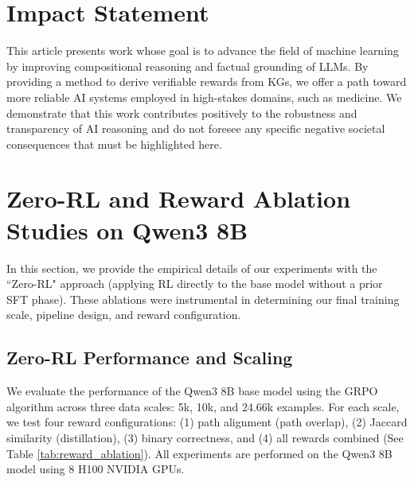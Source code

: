 \documentclass{article}
\theoremstyle{plain}
\theoremstyle{definition}
\theoremstyle{remark}
\begin{document}
\section*{Impact Statement}

This article presents work whose goal is to advance the field of machine
learning by improving compositional reasoning and factual grounding of LLMs. By providing a method to derive verifiable rewards from KGs, we offer a path toward more reliable AI systems employed in high-stakes domains, such as medicine. We demonstrate that this work contributes positively to the robustness and transparency of AI reasoning and do not foresee any specific negative societal consequences that must be highlighted here.





\newpage
\appendix
\onecolumn

\section{Zero-RL and Reward Ablation Studies on Qwen3 8B}
\label{Appendix A}

In this section, we provide the empirical details of our experiments with the ``Zero-RL" approach (applying RL directly to the base model without a prior SFT phase). These ablations were instrumental in determining our final training scale, pipeline design, and reward configuration. 

\subsection{Zero-RL Performance and Scaling}
We evaluate the performance of the Qwen3 8B base model using the GRPO algorithm across three data scales: 5k, 10k, and 24.66k examples. For each scale, we test four reward configurations: (1) path alignment (path overlap), (2) Jaccard similarity (distillation), (3) binary correctness, and (4) all rewards combined (See Table \ref{tab:reward_ablation}). All experiments are performed on the Qwen3 8B model using 8 H100 NVIDIA GPUs.
\end{document}
